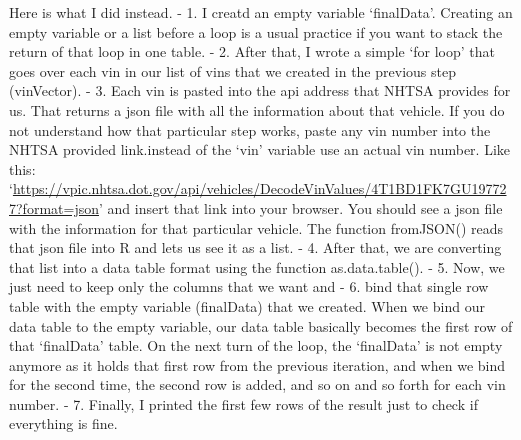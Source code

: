 \documentclass[]{book}
\begin{document}
Here is what I did instead.
- 1. I creatd an empty variable `finalData'.
Creating an empty variable or a list before a loop is a usual practice if you want to stack the return of that loop in one table.
- 2. After that, I wrote a simple `for loop' that goes over each vin in our list of vins that we created in the previous step (vinVector).
- 3. Each vin is pasted into the api address that NHTSA provides for us. That returns a json file with all the information about that vehicle. If you do not understand how that particular step works, paste any vin number into the NHTSA provided link.instead of the `vin' variable use an actual vin number. Like this: `\url{https://vpic.nhtsa.dot.gov/api/vehicles/DecodeVinValues/4T1BD1FK7GU197727?format=json}' and insert that link into your browser. You should see a json file with the information for that particular vehicle. The function fromJSON() reads that json file into R and lets us see it as a list.
- 4. After that, we are converting that list into a data table format using the function as.data.table().
- 5. Now, we just need to keep only the columns that we want and
- 6. bind that single row table with the empty variable (finalData) that we created. When we bind our data table to the empty variable, our data table basically becomes the first row of that `finalData' table. On the next turn of the loop, the `finalData' is not empty anymore as it holds that first row from the previous iteration, and when we bind for the second time, the second row is added, and so on and so forth for each vin number.
- 7. Finally, I printed the first few rows of the result just to check if everything is fine.
\end{document}
